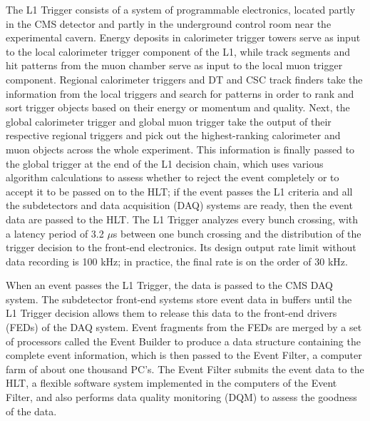 The L1 Trigger consists of a system of programmable electronics, located partly in the CMS detector and partly in the underground control room near the experimental cavern. Energy deposits in calorimeter trigger towers serve as input to the local calorimeter trigger component of the L1, while track segments and hit patterns from the muon chamber serve as input to the local muon trigger component. Regional calorimeter triggers and DT and CSC track finders take the information from the local triggers and search for patterns in order to rank and sort trigger objects based on their energy or momentum and quality. Next, the global calorimeter trigger and global muon trigger take the output of their respective regional triggers and pick out the highest-ranking calorimeter and muon objects across the whole experiment. This information is finally passed to the global trigger at the end of the L1 decision chain, which uses various algorithm calculations to assess whether to reject the event completely or to accept it to be passed on to the HLT; if the event passes the L1 criteria and all the subdetectors and data acquisition (DAQ) systems are ready, then the event data are passed to the HLT. The L1 Trigger analyzes every bunch crossing, with a latency period of 3.2 $\mu$s between one bunch crossing and the distribution of the trigger decision to the front-end electronics. Its design output rate limit without data recording is 100 kHz; in practice, the final rate is on the order of 30 kHz.

When an event passes the L1 Trigger, the data is passed to the CMS DAQ system. The subdetector front-end systems store event data in buffers until the L1 Trigger decision allows them to release this data to the front-end drivers (FEDs) of the DAQ system. Event fragments from the FEDs are merged by a set of processors called the Event Builder to produce a data structure containing the complete event information, which is then passed to the Event Filter, a computer farm of about one thousand PC's. The Event Filter submits the event data to the HLT, a flexible software system implemented in the computers of the Event Filter, and also performs data quality monitoring (DQM) to assess the goodness of the data.

